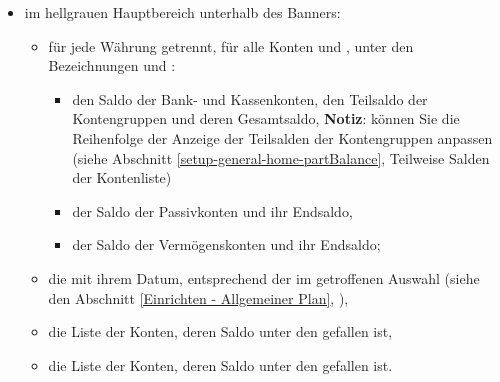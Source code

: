 \begin{itemize}
\begin{itemize}
\begin{itemize}
			 	\end{itemize}
		\end{itemize}
	\item im hellgrauen Hauptbereich unterhalb des Banners:%
	 	\begin{itemize}
	 		\item für jede Währung getrennt, für alle Konten und , unter den Bezeichnungen  und :%
				\begin{itemize}
					\item den Saldo der Bank- und Kassenkonten, den Teilsaldo der Kontengruppen und deren Gesamtsaldo,%
					\newline
					\textbf{Notiz}: können Sie die Reihenfolge der Anzeige der Teilsalden der Kontengruppen anpassen (siehe Abschnitt \vref{setup-general-home-partBalance}, Teilweise Salden der Kontenliste)%
					\item der Saldo der Passivkonten und ihr Endsaldo,%
					\item der Saldo der Vermögenskonten und ihr Endsaldo;%
				\end{itemize}
			\item die  mit ihrem Datum, entsprechend der im  getroffenen Auswahl (siehe den Abschnitt \vref{Einrichten - Allgemeiner Plan}, ),%
			\item die Liste der Konten, deren Saldo unter den  gefallen ist,%
			\item die Liste der Konten, deren Saldo unter den  gefallen ist.%
		\end{itemize}
\end{itemize}

